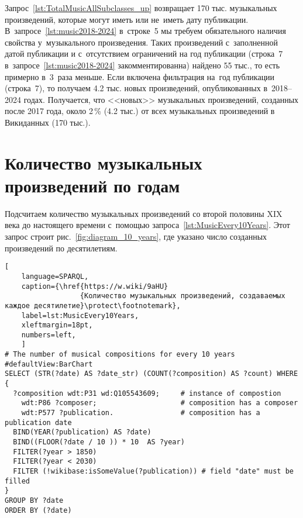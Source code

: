 \newpage
Запрос~\ref{lst:TotalMusicAllSubclasses_up} 
возвращает 170 тыс. музыкальных произведений, которые могут иметь или не~иметь дату публикации. 
В~запросе~\ref{lst:music2018-2024} в~строке~5 
мы требуем обязательного наличия свойства  у~музыкального произведения.
Таких произведений с~заполненной датой публикации и 
с~отсутствием ограничений на год публикации 
(строка~7 в~запросе~\ref{lst:music2018-2024} закомментированна) 
найдено 55 тыс., 
то есть примерно в~3~раза меньше. 
Если включена фильтрация на~год публикации (строка~7), 
то получаем 4.2 тыс. новых произведений, опубликованных в~2018--2024 годах. 
Получается, что <<новых>> музыкальных произведений, созданных после 2017 года,  
около 2\,\% (4.2 тыс.) от всех музыкальных произведений в Викиданных (170 тыс.).









\newpage
\section{Количество музыкальных произведений по годам}

Подсчитаем количество музыкальных произведений 
со второй половины XIX века до настоящего времени 
с~помощью запроса~\ref{lst:MusicEvery10Years}. 
Этот запрос строит рис.~\ref{fig:diagram_10_years}, где 
указано число созданных произведений по десятилетиям. 


\begin{lstlisting}[ 
    language=SPARQL,
    caption={\href{https://w.wiki/9aHU}
                  {Количество музыкальных произведений, создаваемых каждое десятилетие}\protect\footnotemark},
    label=lst:MusicEvery10Years,
    xleftmargin=18pt,
    numbers=left,
    ]
# The number of musical compositions for every 10 years
#defaultView:BarChart
SELECT (STR(?date) AS ?date_str) (COUNT(?composition) AS ?count) WHERE {
  ?composition wdt:P31 wd:Q105543609;     # instance of compostion
    wdt:P86 ?composer;                    # composition has a composer
    wdt:P577 ?publication.                # composition has a publication date
  BIND(YEAR(?publication) AS ?date)
  BIND((FLOOR(?date / 10 )) * 10  AS ?year)
  FILTER(?year > 1850)
  FILTER(?year < 2030) 
  FILTER (!wikibase:isSomeValue(?publication)) # field "date" must be filled
}
GROUP BY ?date
ORDER BY (?date)
\end{lstlisting}%


